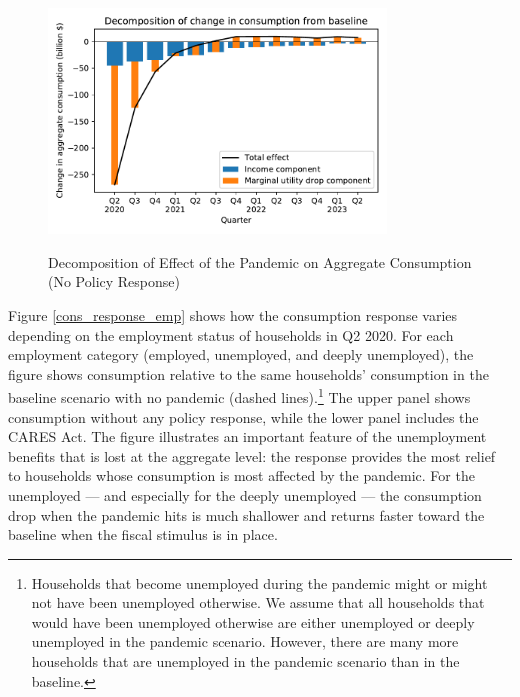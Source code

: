 \documentclass[titlepage,a4paper]{\econtex}
\begin{document}
\begin{figure}
  \centering
  \caption{Decomposition of Effect of the Pandemic on Aggregate Consumption (No Policy Response)}
  \label{cons_response2}
  { \includegraphics[width=0.8\textwidth]{./Figures/Decomposition}}
\end{figure}

Figure \ref{cons_response_emp} shows how the consumption response varies depending on the employment status of households in Q2 2020.
For each employment category (employed, unemployed, and deeply unemployed), the figure shows consumption relative to the same households' consumption in the baseline scenario with no pandemic (dashed lines).\footnote{Households that become unemployed during the pandemic might or might not have been unemployed otherwise. We assume that all households that would have been unemployed otherwise are either unemployed or deeply unemployed in the pandemic scenario. However, there are many more households that are unemployed in the pandemic scenario than in the baseline.}
The upper panel shows consumption without any policy response, while the lower panel includes the CARES Act.
The figure illustrates an important feature of the unemployment benefits that is lost at the aggregate level: the response provides the most relief to households whose consumption is most affected by the pandemic.
For the unemployed --- and especially for the deeply unemployed --- the consumption drop when the pandemic hits is much shallower and returns faster toward the baseline when the fiscal stimulus is in place.
\end{document}
